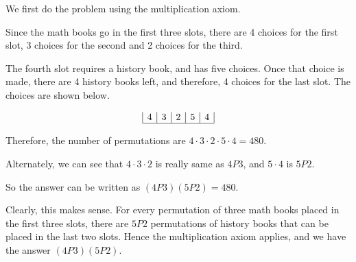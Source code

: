 \begin{solution}
    We first do the problem using the multiplication axiom.

    Since the math books go in the first three slots, there are 4 choices for the first slot, 3 choices for the second and 2 choices for the third.

    The fourth slot requires a history book, and has five choices. Once that choice is made, there are 4 history books left, and therefore, 4 choices for the last slot. The choices are shown below.

    \[
        \begin{array}{|c|c|c|c|c|}
            4 & 3 & 2 & 5 & 4 \\
            \hline
        \end{array}
    \]

    Therefore, the number of permutations are \( 4 \cdot 3 \cdot 2 \cdot 5 \cdot 4 = 480 \).

    Alternately, we can see that \( 4 \cdot 3 \cdot 2 \) is really same as \( 4P3 \), and \( 5 \cdot 4 \) is \( 5P2 \).

    So the answer can be written as \( (4P3)(5P2) = 480 \).

    Clearly, this makes sense. For every permutation of three math books placed in the first three slots, there are \( 5P2 \) permutations of history books that can be placed in the last two slots. Hence the multiplication axiom applies, and we have the answer \( (4P3)(5P2) \).
\end{solution}

